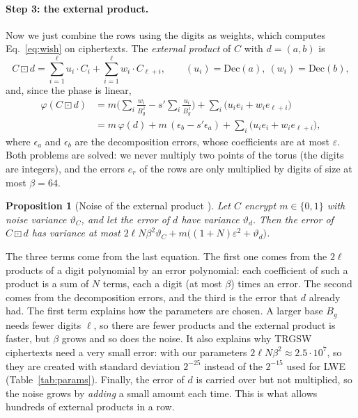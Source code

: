 \documentclass[12pt]{article}
\theoremstyle{plain}
\newtheorem{proposition}{Proposition}
\theoremstyle{definition}
\newcommand{\Bg}{B_g}
\newcommand{\ext}{\boxdot}
\newcommand{\Dec}{\mathrm{Dec}}
\begin{document}
\paragraph{Step 3: the external product.}
Now we just combine the rows using the digits as weights, which computes
Eq.~\eqref{eq:wish} on ciphertexts. The \emph{external product} of $C$ with
$d=(a,b)$ is
\begin{equation}
  C\ext d=\sum_{i=1}^{\ell}u_i\cdot C_i+\sum_{i=1}^{\ell}w_i\cdot C_{\ell+i},
  \qquad (u_i)=\Dec(a),\ (w_i)=\Dec(b),
  \label{eq:extprod}
\end{equation}
and, since the phase is linear,
\begin{align*}
\varphi(C\ext d)
  &=m\Big(\sum_i\frac{w_i}{\Bg^{\,i}}-s'\sum_i\frac{u_i}{\Bg^{\,i}}\Big)
    +\sum_i\big(u_ie_i+w_ie_{\ell+i}\big)\\
  &=m\,\varphi(d)+m\,(\epsilon_b-s'\epsilon_a)
    +\sum_i\big(u_ie_i+w_ie_{\ell+i}\big),
\end{align*}
where $\epsilon_a$ and $\epsilon_b$ are the decomposition errors, whose
coefficients are at most $\varepsilon$. Both problems are solved: we never
multiply two points of the torus (the digits are integers), and the errors
$e_r$ of the rows are only multiplied by digits of size at most $\beta=64$.

\begin{proposition}[Noise of the external product {\cite{chillotti2020tfhe}}]
\label{prop:extprod}
Let $C$ encrypt $m\in\{0,1\}$ with noise variance $\vartheta_C$, and let the error
of $d$ have variance $\vartheta_d$. Then the error of $C\ext d$ has variance at
most $2\ell N\beta^2\vartheta_C+m\big((1+N)\varepsilon^2+\vartheta_d\big)$.
\end{proposition}

The three terms come from the last equation. The first one comes from the
$2\ell$ products of a digit polynomial by an error polynomial: each coefficient
of such a product is a sum of $N$ terms, each a digit (at most $\beta$) times an
error. The second comes from the decomposition errors, and the third is the
error that $d$ already had. The first term explains how the parameters are
chosen. A larger base $\Bg$ needs fewer digits $\ell$, so there are fewer
products and the external product is faster, but $\beta$ grows and so does the
noise. It also explains why TRGSW ciphertexts need a very small error: with our
parameters $2\ell N\beta^2\approx2.5\cdot10^7$, so they are created with standard
deviation $2^{-25}$ instead of the $2^{-15}$ used for LWE
(Table~\ref{tab:params}). Finally, the error of $d$ is carried over but not
multiplied, so the noise grows by \emph{adding} a small amount each time. This
is what allows hundreds of external products in a row.
\end{document}
